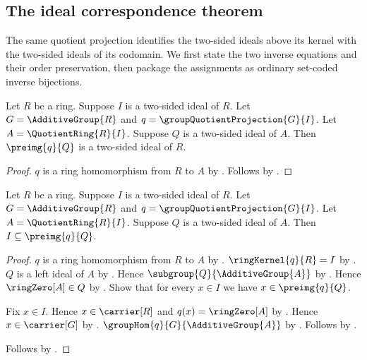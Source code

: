 \subsection{The ideal correspondence theorem}

The same quotient projection identifies the two-sided ideals above its kernel
with the two-sided ideals of its codomain.  We first state the two inverse
equations and their order preservation, then package the assignments as
ordinary set-coded inverse bijections.

\begin{theorem}\label{ring_quotient_correspondence_preimage_ideal}
    Let $R$ be a ring.
    Suppose $I$ is a two-sided ideal of $R$.
    Let $G=\AdditiveGroup{R}$ and
        $q=\groupQuotientProjection{G}{I}$.
    Let $A=\QuotientRing{R}{I}$.
    Suppose $Q$ is a two-sided ideal of $A$.
    Then $\preimg{q}{Q}$ is a two-sided ideal of $R$.
\end{theorem}
\begin{proof}
    $q$ is a ring homomorphism from $R$ to $A$ by
        .
    Follows by .
\end{proof}

\begin{theorem}\label{ring_quotient_correspondence_preimage_contains_kernel}
    Let $R$ be a ring.
    Suppose $I$ is a two-sided ideal of $R$.
    Let $G=\AdditiveGroup{R}$ and
        $q=\groupQuotientProjection{G}{I}$.
    Let $A=\QuotientRing{R}{I}$.
    Suppose $Q$ is a two-sided ideal of $A$.
    Then $I\subseteq\preimg{q}{Q}$.
\end{theorem}
\begin{proof}
    $q$ is a ring homomorphism from $R$ to $A$ by
        .
    $\ringKernel{q}{R}=I$ by
        .
    $Q$ is a left ideal of $A$ by .
    Hence $\subgroup{Q}{\AdditiveGroup{A}}$ by
        .
    Hence $\ringZero[A]\in Q$ by
        .
    Show that for every $x\in I$ we have $x\in\preimg{q}{Q}$.
    \begin{subproof}
        Fix $x\in I$.
        Hence $x\in\carrier[R]$ and $q(x)=\ringZero[A]$ by
            .
        Hence $x\in\carrier[G]$ by .
        $\groupHom{q}{G}{\AdditiveGroup{A}}$ by
            .
        Follows by
            .
    \end{subproof}
    Follows by .
\end{proof}

